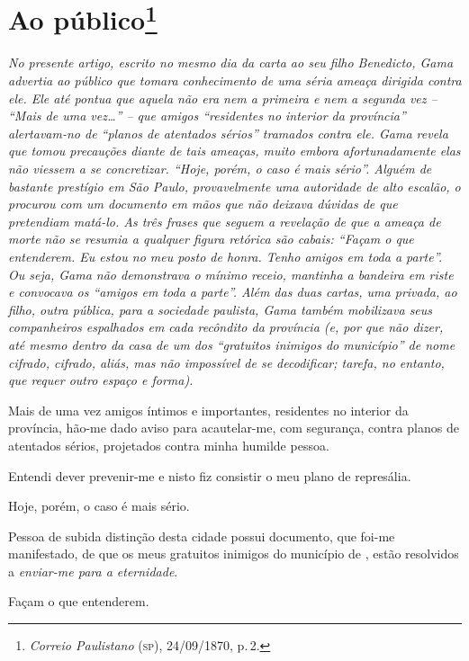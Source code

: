\chapter{Ao público\footnote{\emph{Correio Paulistano} (\textsc{sp}), 24/09/1870, p.\,2.}} %


\begin{didascalia}
\emph{No presente artigo, escrito no mesmo dia da carta ao seu filho
Benedicto, Gama advertia ao público que tomara conhecimento de uma séria
ameaça dirigida contra ele. Ele até pontua que aquela não era nem a
primeira e nem a segunda vez -- ``Mais de uma vez\ldots{}'' -- que amigos
``residentes no interior da província'' alertavam-no de ``planos de
atentados sérios'' tramados contra ele. Gama revela que tomou precauções
diante de tais ameaças, muito embora afortunadamente elas não viessem a
se concretizar. ``Hoje, porém, o caso é mais sério''. Alguém de bastante
prestígio em São Paulo, provavelmente uma autoridade de alto escalão, o
procurou com um documento em mãos que não deixava dúvidas de que
pretendiam matá-lo. As três frases que seguem a revelação de que a
ameaça de morte não se resumia a qualquer figura retórica são cabais:
``Façam o que entenderem. Eu estou no meu posto de honra. Tenho amigos em
toda a parte''. Ou seja, Gama não demonstrava o mínimo receio, mantinha a
bandeira em riste e convocava os ``amigos em toda a parte''. Além das duas
cartas, uma privada, ao filho, outra pública, para a sociedade paulista,
Gama também mobilizava seus companheiros espalhados em cada recôndito da
província (e, por que não dizer, até mesmo dentro da casa de um dos
``gratuitos inimigos do município'' de nome cifrado, cifrado, aliás, mas
não impossível de se decodificar; tarefa, no entanto, que requer outro
espaço e forma).}
\end{didascalia}


Mais de uma vez amigos íntimos e importantes, residentes no interior da
província, hão-me dado aviso para acautelar-me, com segurança, contra
planos de atentados sérios, projetados contra minha humilde pessoa.

Entendi dever prevenir-me e nisto fiz consistir o meu plano de
represália.

Hoje, porém, o caso é mais sério.

Pessoa de subida distinção desta cidade possui documento, que foi-me
manifestado, de que os meus gratuitos inimigos do município de \asterisc{},
estão resolvidos a \emph{enviar-me para a eternidade}.

Façam o que entenderem.


